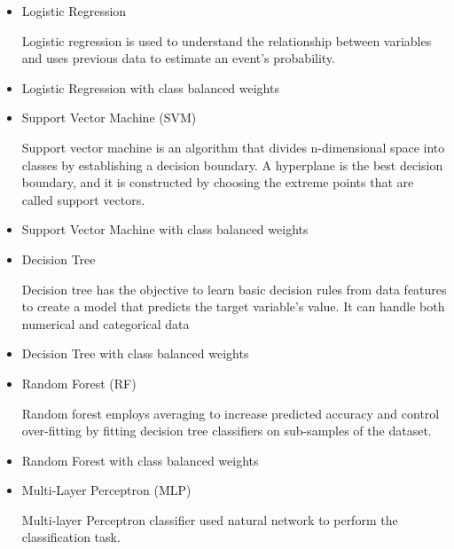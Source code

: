 \begin{itemize}
  \item Logistic Regression
  
  Logistic regression is used to understand the relationship between variables and uses previous data to estimate an event’s probability.
  
  \item Logistic Regression with class balanced weights
  
  \item Support Vector Machine (SVM)
  
  Support vector machine is an algorithm that divides n-dimensional space into classes by establishing a decision boundary. A hyperplane is the best decision boundary, and it is constructed by choosing the extreme points that are called support vectors.
  
  \item Support Vector Machine with class balanced weights
  
  \item Decision Tree
  
  Decision tree has the objective to learn basic decision rules from data features to create a model that predicts the target variable's value. It can handle both numerical and categorical data
  
  \item Decision Tree with class balanced weights
  
  \item Random Forest (RF)
  
  Random forest employs averaging to increase predicted accuracy and control over-fitting by fitting decision tree classifiers on sub-samples of the dataset.
  
  \item Random Forest with class balanced weights
  
  \item Multi-Layer Perceptron (MLP)
  
  Multi-layer Perceptron classifier used natural network to perform the classification task.
  
\end{itemize}
